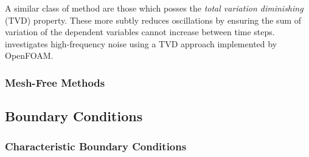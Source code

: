 A similar class of method are those which posses the \emph{total variation diminishing} (TVD) property. These more subtly reduces oscillations by ensuring the sum of variation of the dependent variables cannot increase between time steps. \cite{eigemann2025AmplificationThermoacousticFlame} investigates high-frequency noise using a TVD approach implemented by OpenFOAM.



\subsubsection{Mesh-Free Methods}











\subsection{Boundary Conditions}

\subsubsection{Characteristic Boundary Conditions}

